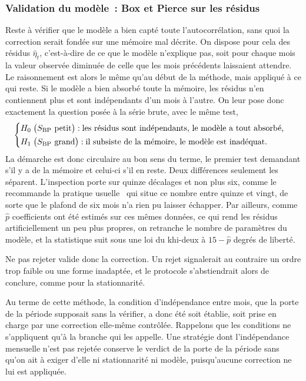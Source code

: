 \subsubsection*{Validation du modèle~: Box et Pierce sur les résidus}

Reste à vérifier que le modèle a bien capté toute l'autocorrélation, sans quoi
la correction serait fondée sur une mémoire mal décrite. On dispose pour cela
des résidus \(\hat\eta_t\), c'est-à-dire de ce que le modèle n'explique pas,
soit pour chaque mois la valeur observée diminuée de celle que les mois
précédents laissaient attendre. Le raisonnement est alors le même qu'au début
de la méthode, mais appliqué à ce qui reste. Si le modèle a bien absorbé toute
la mémoire, les résidus n'en contiennent plus et sont indépendants d'un mois à
l'autre. On leur pose donc exactement la question posée à la série brute, avec
le même test,
\[
  \begin{cases}
    H_0 \;\bigl(S_{\mathrm{BP}} \text{ petit}\bigr) : \text{les résidus sont indépendants, le modèle a tout absorbé,}\\[2pt]
    H_1 \;\bigl(S_{\mathrm{BP}} \text{ grand}\bigr) : \text{il subsiste de la mémoire, le modèle est inadéquat.}
  \end{cases}
\]
La démarche est donc circulaire au bon sens du terme, le premier test
demandant s'il y a de la mémoire et celui-ci s'il en reste. Deux différences
seulement les séparent. L'inspection porte sur quinze décalages et non plus
six, comme le recommande la pratique usuelle~\cite{boxpierce1970} qui situe ce
nombre entre quinze et vingt, de sorte que le plafond de six mois n'a rien pu
laisser échapper. Par ailleurs, comme \(\hat p\) coefficients ont été estimés
sur ces mêmes données, ce qui rend les résidus artificiellement un peu plus
propres, on retranche le nombre de paramètres du modèle, et la statistique
suit sous \Hzero{} une loi du khi-deux à \(15 - \hat p\) degrés de liberté.

Ne pas rejeter valide donc la correction. Un rejet signalerait au contraire un
ordre trop faible ou une forme inadaptée, et le protocole s'abstiendrait alors
de conclure, comme pour la stationnarité.

Au terme de cette méthode, la condition d'indépendance entre mois, que la
porte de la période supposait sans la vérifier, a donc été soit établie, soit
prise en charge par une correction elle-même contrôlée. Rappelons que les
conditions ne s'appliquent qu'à la branche qui les appelle. Une stratégie dont
l'indépendance mensuelle n'est pas rejetée conserve le verdict de la porte de
la période sans qu'on ait à exiger d'elle ni stationnarité ni modèle,
puisqu'aucune correction ne lui est appliquée.

